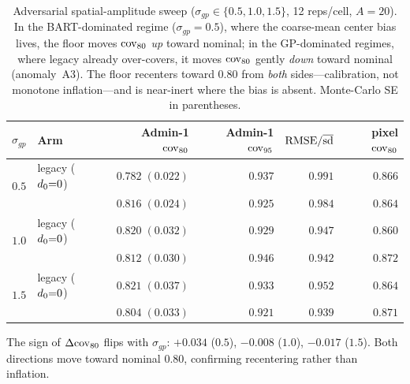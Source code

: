 \begin{table}[t]
\centering
\small
\caption{Adversarial spatial-amplitude sweep ($\sigma_{gp}\in\{0.5,1.0,1.5\}$,
12 reps/cell, $A=20$). In the BART-dominated regime ($\sigma_{gp}=0.5$), where the
coarse-mean center bias lives, the floor moves $\mathrm{cov}_{80}$ \emph{up} toward nominal;
in the GP-dominated regimes, where legacy already over-covers, it moves $\mathrm{cov}_{80}$
gently \emph{down} toward nominal (anomaly~A3). The floor recenters toward $0.80$
from \emph{both} sides---calibration, not monotone inflation---and is near-inert
where the bias is absent. Monte-Carlo SE in parentheses.}
\label{tab:adversarial}
\begin{tabular}{c l rr r r}
\toprule
$\sigma_{gp}$ & Arm & Admin-1 $\mathrm{cov}_{80}$ & Admin-1 $\mathrm{cov}_{95}$ & $\mathrm{RMSE}/\overline{\mathrm{sd}}$ & pixel $\mathrm{cov}_{80}$ \\
\midrule
\multirow{2}{*}{$0.5$} & legacy ($d_0{=}0$) & $0.782\;(0.022)$ & $0.937$ & $0.991$ & $0.866$ \\
                       & \bartsimpsd{}      & $0.816\;(0.024)$ & $0.925$ & $0.984$ & $0.864$ \\
\midrule
\multirow{2}{*}{$1.0$} & legacy ($d_0{=}0$) & $0.820\;(0.032)$ & $0.929$ & $0.947$ & $0.860$ \\
                       & \bartsimpsd{}      & $0.812\;(0.030)$ & $0.946$ & $0.942$ & $0.872$ \\
\midrule
\multirow{2}{*}{$1.5$} & legacy ($d_0{=}0$) & $0.821\;(0.037)$ & $0.933$ & $0.952$ & $0.864$ \\
                       & \bartsimpsd{}      & $0.804\;(0.033)$ & $0.921$ & $0.939$ & $0.871$ \\
\bottomrule
\end{tabular}

\vspace{2pt}
{\footnotesize The sign of $\Delta\mathrm{cov}_{80}$ flips with $\sigma_{gp}$: $+0.034$
($0.5$), $-0.008$ ($1.0$), $-0.017$ ($1.5$). Both directions move toward nominal
$0.80$, confirming recentering rather than inflation.}
\end{table}
